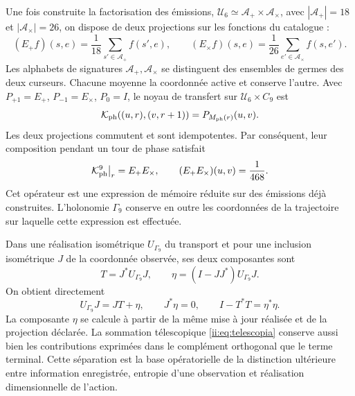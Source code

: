 Une fois construite la factorisation des émissions, \(\mathcal U_6\simeq\mathcal A_+\times\mathcal A_\times\), avec \(|\mathcal A_+|=18\) et \(|\mathcal A_\times|=26\), on dispose de deux projections sur les fonctions du catalogue :
\[
 (E_+f)(s,e)=\frac1{18}\sum_{s'\in\mathcal A_+}f(s',e),\qquad
 (E_\times f)(s,e)=\frac1{26}\sum_{e'\in\mathcal A_\times}f(s,e').
\]
Les alphabets de signatures \(\mathcal A_+,\mathcal A_\times\) se distinguent des ensembles de germes des deux curseurs. Chacune moyenne la coordonnée active et conserve l'autre. Avec \(P_{+1}=E_+\), \(P_{-1}=E_\times\), \(P_0=I\), le noyau de transfert sur \(\mathcal U_6\times C_9\) est
\[
 \mathcal K_{\rm ph}((u,r),(v,r+1))=P_{M_{\rm ph}(r)}(u,v).
\]
Les deux projections commutent et sont idempotentes. Par conséquent, leur composition pendant un tour de phase satisfait
\begin{equation}
 \mathcal K_{\rm ph}^{9}\big|_r=E_+E_\times,\qquad
 (E_+E_\times)(u,v)=\frac1{468}.
 \label{ii:ii:tpk-renovacion}
\end{equation}
Cet opérateur est une expression de mémoire réduite sur des émissions déjà construites. L’holonomie \(\Gamma_9\) conserve en outre les coordonnées de la trajectoire sur laquelle cette expression est effectuée.

Dans une réalisation isométrique \(U_{\Gamma_9}\) du transport et pour une inclusion isométrique \(J\) de la coordonnée observée, ses deux composantes sont
\[
 T=J^*U_{\Gamma_9}J,\qquad
 \eta=(I-JJ^*)U_{\Gamma_9}J.
\]
On obtient directement
\[
 U_{\Gamma_9}J=JT+\eta,\qquad J^*\eta=0,\qquad
 I-T^*T=\eta^*\eta.
\]
La composante \(\eta\) se calcule à partir de la même mise à jour réalisée et de la projection déclarée. La sommation télescopique \eqref{ii:eq:telescopia} conserve aussi bien les contributions exprimées dans le complément orthogonal que le terme terminal. Cette séparation est la base opératorielle de la distinction ultérieure entre information enregistrée, entropie d'une observation et réalisation dimensionnelle de l'action.
